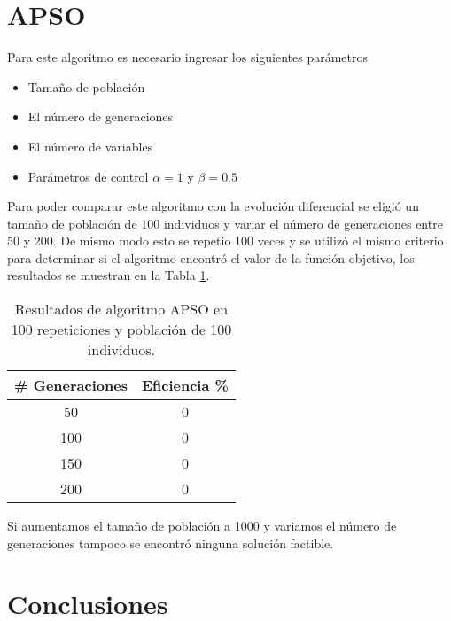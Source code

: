 \documentclass[conference]{IEEEtran}
\begin{document}
\section{APSO}

Para este algoritmo es necesario ingresar los siguientes parámetros
\begin{itemize}
\item Tamaño de población
\item El número de generaciones
\item El número de variables
\item Parámetros de control $\alpha = 1$ y $\beta = 0.5$
\end{itemize}

Para poder comparar este algoritmo con la evolución diferencial se eligió un tamaño de población de 100 individuos y variar el número de generaciones  entre 50 y 200. De mismo modo esto se repetio 100 veces y se utilizó el mismo criterio  para determinar si el algoritmo encontró el valor de la función objetivo, los resultados se muestran en la Tabla \ref{tab:APSO}.


\begin{table}[h!]   
	\caption{Resultados de algoritmo APSO en 100 repeticiones y población de 100 individuos.}                                                                                                                
		\centering                                       
		\begin{tabular}{cc}
			\hline                                             
			\#{} Generaciones & Eficiencia \% \\                     
			\hline 
			50 & 0\\                                            
			100 & 0\\
			150 & 0\\
			200 & 0\\
			\hline                                             
		\end{tabular}
		\label{tab:APSO}
	\end{table}	

Si aumentamos el tamaño de población a 1000 y variamos el número de generaciones tampoco se encontró ninguna solución factible.

\section{Conclusiones}
\end{document}
